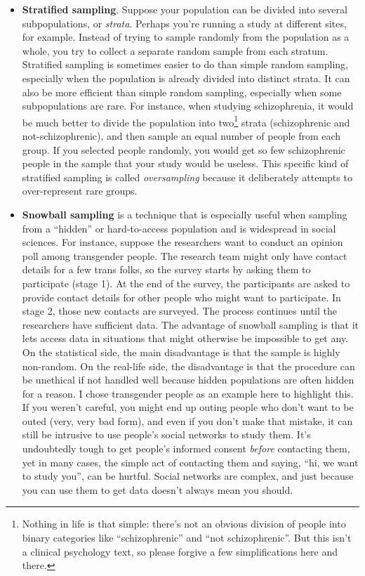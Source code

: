 \documentclass[
]{book}
\providecommand{\tightlist}{%
  \setlength{\itemsep}{0pt}\setlength{\parskip}{0pt}}
\theoremstyle{definition}
\theoremstyle{definition}
\theoremstyle{definition}
\theoremstyle{definition}
\theoremstyle{remark}
\begin{document}
\begin{itemize}
\tightlist
\item
  \textbf{Stratified sampling}. Suppose your population can be divided into several subpopulations, or \emph{strata}. Perhaps you're running a study at different sites, for example. Instead of trying to sample randomly from the population as a whole, you try to collect a separate random sample from each stratum. Stratified sampling is sometimes easier to do than simple random sampling, especially when the population is already divided into distinct strata. It can also be more efficient than simple random sampling, especially when some subpopulations are rare. For instance, when studying schizophrenia, it would be much better to divide the population into two\footnote{Nothing in life is that simple: there's not an obvious division of people into binary categories like ``schizophrenic'' and ``not schizophrenic''. But this isn't a clinical psychology text, so please forgive a few simplifications here and there.} strata (schizophrenic and not-schizophrenic), and then sample an equal number of people from each group. If you selected people randomly, you would get so few schizophrenic people in the sample that your study would be useless. This specific kind of stratified sampling is called \emph{oversampling} because it deliberately attempts to over-represent rare groups.
\item
  \textbf{Snowball sampling} is a technique that is especially useful when sampling from a ``hidden'' or hard-to-access population and is widespread in social sciences. For instance, suppose the researchers want to conduct an opinion poll among transgender people. The research team might only have contact details for a few trans folks, so the survey starts by asking them to participate (stage 1). At the end of the survey, the participants are asked to provide contact details for other people who might want to participate. In stage 2, those new contacts are surveyed. The process continues until the researchers have sufficient data. The advantage of snowball sampling is that it lets access data in situations that might otherwise be impossible to get any. On the statistical side, the main disadvantage is that the sample is highly non-random. On the real-life side, the disadvantage is that the procedure can be unethical if not handled well because hidden populations are often hidden for a reason. I chose transgender people as an example here to highlight this. If you weren't careful, you might end up outing people who don't want to be outed (very, very bad form), and even if you don't make that mistake, it can still be intrusive to use people's social networks to study them. It's undoubtedly tough to get people's informed consent \emph{before} contacting them, yet in many cases, the simple act of contacting them and saying, ``hi, we want to study you'', can be hurtful. Social networks are complex, and just because you can use them to get data doesn't always mean you should.

\end{itemize}
\end{document}
